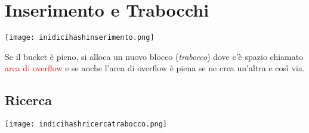 \documentclass[12pt]{article}
\begin{document}
\section{Inserimento e Trabocchi}
\begin{center}
    \texttt{[image: inidicihashinserimento.png]}
\end{center}
Se il bucket è pieno, si alloca un nuovo blocco (\textit{trabocco}) dove c'è spazio chiamato \textcolor{red}{area di overflow} e se anche l'area di overflow è piena se ne crea un'altra e così via.
\subsection{Ricerca}
\begin{center}
    \texttt{[image: indicihashricercatrabocco.png]}
\end{center}
\end{document}
